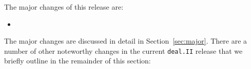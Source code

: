 \documentclass{ansarticle-preprint}
\newcommand{\specialword}[1]{\texttt{#1}}
\newcommand{\dealii}{{\specialword{deal.II}}\xspace}
\begin{document}
The major changes of this release are:
%
\begin{itemize}
\item
\end{itemize}
%
The major changes are discussed in detail in Section~\ref{sec:major}. There
are a number of other noteworthy changes in the current \dealii{} release
that we briefly outline in the remainder of this section:
%
\end{document}

